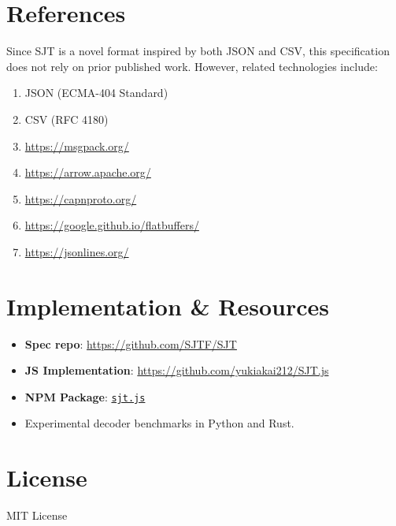 \documentclass[12pt]{article}
\begin{document}
\section{References}
Since SJT is a novel format inspired by both JSON and CSV, this specification does not rely on prior published work. However, related technologies include:

\begin{enumerate}
  \item JSON (ECMA-404 Standard)
  \item CSV (RFC 4180)
  \item \url{https://msgpack.org/}
  \item \url{https://arrow.apache.org/}
  \item \url{https://capnproto.org/}
  \item \url{https://google.github.io/flatbuffers/}
  \item \url{https://jsonlines.org/}
\end{enumerate}

\section{Implementation \& Resources}
\begin{itemize}
  \item \textbf{Spec repo}: \url{https://github.com/SJTF/SJT}
  \item \textbf{JS Implementation}: \url{https://github.com/yukiakai212/SJT.js}
  \item \textbf{NPM Package}: \href{https://www.npmjs.com/package/sjt.js}{\texttt{sjt.js}}
  \item Experimental decoder benchmarks in Python and Rust.
\end{itemize}

\section{License}
MIT License
\end{document}
